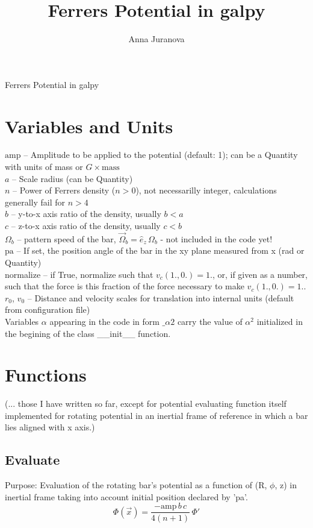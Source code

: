 \documentclass[a4paper,11pt]{article}
\author{Anna Juranova}
\title{Ferrers Potential in galpy}
\begin{document}
	
	\begin{center}
		\huge{Ferrers Potential in galpy}\\
	\end{center}

	\section{Variables and Units}
           $ \mathrm{amp} $ -- Amplitude to be applied to the potential (default: 1); can be a Quantity with units of mass or $ G \times \mathrm{mass} $\\
           $ a $ -- Scale radius (can be Quantity)\\
           $ n $ -- Power of Ferrers density ($ n > 0 $), not necessarilly integer, calculations generally fail for $ n > 4 $\\
           $ b $ -- y-to-x axis ratio of the density, usually $ b < a $\\
           $ c $ -- z-to-x axis ratio of the density, usually $ c < b $\\
           $ \Omega_b $ -- pattern speed of the bar, $ \vec{\Omega}_b = \hat{e}_z\,\Omega_b $ - not included in the code yet!\\
           $ \mathrm{pa} $ -- If set, the position angle of the bar in the xy plane measured from x (rad or Quantity)\\
           normalize -- if True, normalize such that $ v_c(1.,0.)=1. $, or, if given as a number, such that the force is this fraction of the force necessary to make $ v_c(1.,0.)=1. $.\\
           $ r_0 $, $ v_0 $ -- Distance and velocity scales for translation into internal units (default from configuration file)\\
           Variables $ \alpha $	appearing in the code in form $ \_\alpha2 $ carry the value of $ \alpha^2 $ initialized in the begining of the class \_\_init\_\_ function.

	\section{Functions}
	(... those I have written so far, except for potential evaluating function itself implemented for rotating potential in an inertial frame of reference in which a bar lies aligned with x axis.)
		 
		\subsection{Evaluate} %
			Purpose: Evaluation of the rotating bar's potential as a function of (R, $ \phi $, z) in inertial frame taking into account initial position declared by 'pa'. \\
   		\begin{equation}
   		\Phi(\vec{x}) = \frac{-\mathrm{amp}\,b\,c}{4(n+1)}\,\Phi'
   		\end{equation}	
	   		
	
\end{document}
